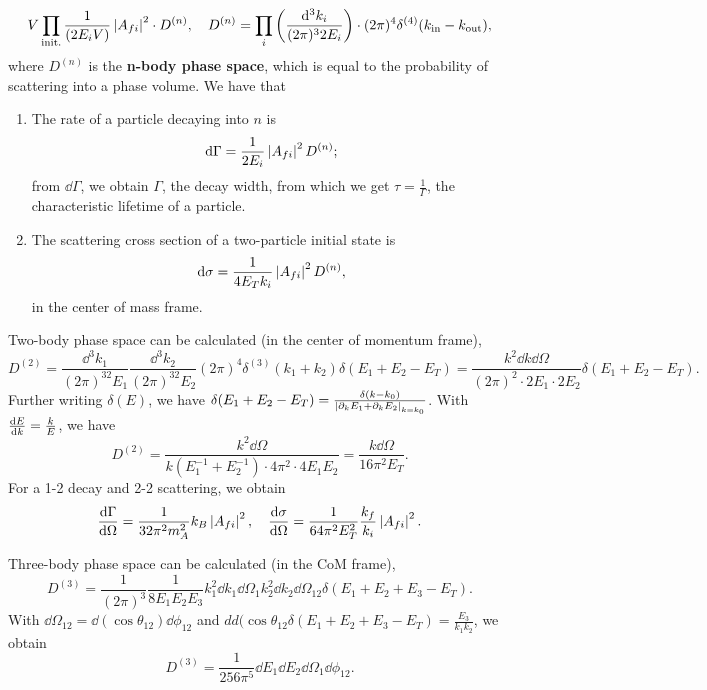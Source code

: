 \documentclass{article}
\begin{document}
\begin{equation}
    V\prod_\text{init.}\frac 1{(2E_iV)}\left\lvert A_{fi}\right\rvert^2\cdot D^{(n)},\quad D^{(n)}=\prod_i\left(\frac{\dd^3k_i}{(2\pi)^32E_i}\right)\cdot(2\pi)^4\delta^{(4)}(k_\text{in}-k_\text{out}),
\end{equation}
where $D^{(n)}$ is the \textbf{n-body phase space}, which is equal to the probability of scattering into a phase volume. We have that 
\begin{enumerate}
    \item The rate of a particle decaying into $n$ is 
    $$\dd\Gamma=\frac 1{2E_i}\left\lvert A_{fi}\right\rvert^2D^{(n)};$$
    from $\dd\Gamma$, we obtain $\Gamma$, the decay width, from which we get $\tau=\frac 1\Gamma$, the characteristic lifetime of a particle. 
    \item The scattering cross section of a two-particle initial state is 
    $$\dd\sigma=\frac 1{4E_Tk_i}\left\lvert A_{fi}\right\rvert^2D^{(n)},$$
    in the center of mass frame.
\end{enumerate}


\example Two-body phase space can be calculated (in the center of momentum frame),
$$D^{(2)}=\frac{\dd^3k_1}{(2\pi)^32E_1}\frac{\dd^3k_2}{(2\pi)^32E_2}(2\pi)^4\delta^{(3)}(k_1+k_2)\delta(E_1+E_2-E_T)=\frac{k^2\dd k\dd\Omega}{(2\pi)^2\cdot 2E_1\cdot 2E_2}\delta(E_1+E_2-E_T).$$
Further writing $\delta(E)$, we have $\delta(E_1+E_2-E_T)=\frac{\delta(k-k_0)}{\left\lvert\partial_kE_1+\partial_kE_2\right\rvert_{k=k_0}}$. With $\frac{\mathrm{d}E}{\mathrm{d}k}=\frac k{E}$, we have 
\begin{equation}
    D^{(2)}=\frac{k^2\dd\Omega}{k(E_1^{-1}+E_2^{-1})\cdot 4\pi^2\cdot 4E_1E_2}=\frac{k\dd\Omega}{16\pi^2E_T}.
\end{equation}
For a 1-2 decay and 2-2 scattering, we obtain
$$\frac{\mathrm{d}\Gamma}{\mathrm{d}\Omega}=\frac{1}{32\pi^2m_A^2}k_B\left\lvert A_{fi}\right\rvert^2,\quad\frac{\mathrm{d}\sigma}{\mathrm{d}\Omega}=\frac 1{64\pi^2E_T^2}\frac{k_f}{k_i}\left\lvert A_{fi}\right\rvert^2.$$

\example Three-body phase space can be calculated (in the CoM frame),
$$D^{(3)}=\frac 1{(2\pi)^3}\frac 1{8E_1E_2E_3}k^2_1\dd k_1\dd\Omega_1k^2_2\dd k_2\dd\Omega_{12}\delta(E_1+E_2+E_3-E_T).$$
With $\dd\Omega_{12}=\dd(\cos\theta_{12})\dd\phi_{12}$ and $dd(\cos\theta_{12}\delta(E_1+E_2+E_3-E_T)=\frac{E_3}{k_1k_2}$, we obtain
$$D^{(3)}=\frac 1{256\pi^5}\dd E_1\dd E_2\dd\Omega_1\dd\phi_{12}.$$
\end{document}
